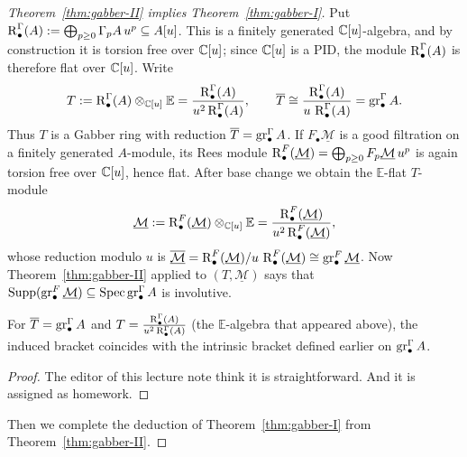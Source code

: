 \begin{proof}[Theorem~\ref{thm:gabber-II} implies Theorem~\ref{thm:gabber-I}]
	Put $\operatorname{R}^{\Gamma}_\bullet(A):=\bigoplus_{p\ge0}\Gamma_pA\,u^p\subseteq A[u]$.  This is a finitely generated
	$\mathbb{C}[u]$-algebra, and by construction it is torsion free over $\mathbb{C}[u]$; since $\mathbb{C}[u]$ is a PID, the
	module $\operatorname{R}^{\Gamma}_\bullet(A)$ is therefore flat over $\mathbb{C}[u]$.  Write
	\[
		T := \operatorname{R}^{\Gamma}_\bullet(A)\otimes_{\mathbb{C}[u]}\mathbb E
		= \frac{\operatorname{R}^{\Gamma}_\bullet(A)}{u^2\operatorname{R}^{\Gamma}_\bullet(A)},
		\qquad
		\overline T \cong \frac{\operatorname{R}^{\Gamma}_\bullet(A)}{u\,\operatorname{R}^{\Gamma}_\bullet(A)}
		= \operatorname{gr}^{\Gamma}_\bullet A.
	\]
	Thus $T$ is a Gabber ring with reduction $\overline T=\operatorname{gr}^{\Gamma}_\bullet A$.  If $F_\bullet\underline{\mathcal M}$ is a
	good filtration on a finitely generated $A$-module, its Rees module
	$\operatorname{R}^{F}_\bullet(\underline{\mathcal M})=\bigoplus_{p\ge0}F_p\underline{\mathcal M}\,u^p$ is again torsion free over $\mathbb{C}[u]$,
	hence flat.  After base change we obtain the $\mathbb E$-flat $T$-module
	\[
		\underline{\mathcal{M}} := \operatorname{R}^{F}_\bullet(\underline{\mathcal M})\otimes_{\mathbb{C}[u]}\mathbb E
		= \frac{\operatorname{R}^{F}_\bullet(\underline{\mathcal M})}{u^2\operatorname{R}^{F}_\bullet(\underline{\mathcal M})},
	\]
	whose reduction modulo $u$ is
	$\overline{\underline{\mathcal{M}}}=\operatorname{R}^{F}_\bullet(\underline{\mathcal M})/u\,\operatorname{R}^{F}_\bullet(\underline{\mathcal M})\cong\operatorname{gr}^{F}_\bullet\underline{\mathcal M}$.  Now
	Theorem~\ref{thm:gabber-II} applied to $(T,\underline{\mathcal{M}})$ says that
	$\operatorname{Supp}(\operatorname{gr}^{F}_\bullet\underline{\mathcal M})\subseteq\operatorname{Spec}\operatorname{gr}^{\Gamma}_\bullet A$ is involutive.

	\begin{lemma}\label{lem:rees}
		For $\overline T=\operatorname{gr}^{\Gamma}_\bullet A$ and $T=\frac{\operatorname{R}^{\Gamma}_\bullet(A)}{u^2\operatorname{R}^{\Gamma}_\bullet(A)}$
		(the $\mathbb E$-algebra that appeared above), the induced bracket coincides with the intrinsic
		bracket defined earlier on $\operatorname{gr}^{\Gamma}_\bullet A$.
	\end{lemma}
	\begin{proof}
		The editor of this lecture note think it is straightforward. And it is assigned as homework.
	\end{proof}

	Then we complete the deduction of Theorem~\ref{thm:gabber-I} from Theorem~\ref{thm:gabber-II}.
\end{proof}

